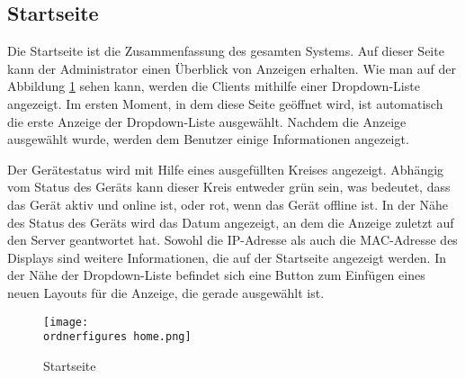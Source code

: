 

\subsection{Startseite}

Die Startseite ist die Zusammenfassung des gesamten Systems. Auf dieser Seite kann der Administrator einen Überblick von Anzeigen erhalten. Wie man auf der Abbildung \ref{fi:home} sehen kann, werden die Clients mithilfe einer Dropdown-Liste angezeigt. Im ersten Moment, in dem diese Seite geöffnet wird, ist automatisch die erste Anzeige der Dropdown-Liste ausgewählt. Nachdem die Anzeige ausgewählt wurde, werden dem Benutzer einige Informationen angezeigt.

Der Gerätestatus wird mit Hilfe eines ausgefüllten Kreises angezeigt. Abhängig vom Status des Geräts kann dieser Kreis entweder grün sein, was bedeutet, dass das Gerät aktiv und online ist, oder rot, wenn das Gerät offline ist. In der Nähe des Status des Geräts wird das Datum angezeigt, an dem die Anzeige zuletzt auf den Server geantwortet hat.
Sowohl die IP-Adresse als auch die MAC-Adresse des Displays sind weitere Informationen, die auf der Startseite angezeigt werden.
In der Nähe der Dropdown-Liste befindet sich eine Button zum Einfügen eines neuen Layouts für die Anzeige, die gerade ausgewählt ist.


\begin{figure}[H]
	\centering
	\texttt{[image: \\ordnerfigures home.png]}
	\caption{Startseite}
	\label{fi:home}
\end{figure}


